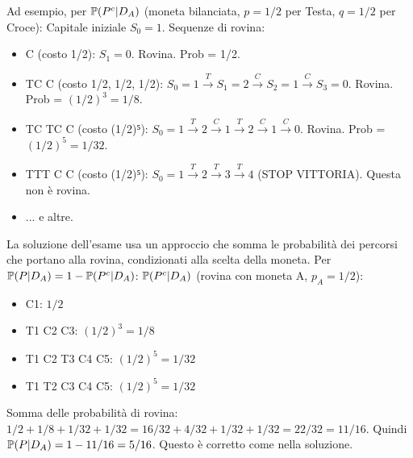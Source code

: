 \documentclass[12pt,a4paper]{article}
\begin{document}
\begin{example}
Ad esempio, per $\mathbb{P}(P^c|D_A)$ (moneta bilanciata, $p=1/2$ per Testa, $q=1/2$ per Croce):
Capitale iniziale $S_0=1$.
Sequenze di rovina:
\begin{itemize}
    \item C (costo 1/2): $S_1=0$. Rovina. Prob = 1/2.
    \item TC C (costo 1/2, 1/2, 1/2): $S_0=1 \xrightarrow{T} S_1=2 \xrightarrow{C} S_2=1 \xrightarrow{C} S_3=0$. Rovina. Prob = $(1/2)^3 = 1/8$.
    \item TC TC C (costo (1/2)⁵): $S_0=1 \xrightarrow{T} 2 \xrightarrow{C} 1 \xrightarrow{T} 2 \xrightarrow{C} 1 \xrightarrow{C} 0$. Rovina. Prob = $(1/2)^5 = 1/32$.
    \item TTT C C (costo (1/2)⁵): $S_0=1 \xrightarrow{T} 2 \xrightarrow{T} 3 \xrightarrow{T} 4$ (STOP VITTORIA). Questa non è rovina.
    \item ... e altre.
\end{itemize}
La soluzione dell'esame usa un approccio che somma le probabilità dei percorsi che portano alla rovina, condizionati alla scelta della moneta.
Per $\mathbb{P}(P|D_A) = 1 - \mathbb{P}(P^c|D_A)$:
$\mathbb{P}(P^c|D_A)$ (rovina con moneta A, $p_A=1/2$):
\begin{itemize}
    \item C1: $1/2$
    \item T1 C2 C3: $(1/2)^3 = 1/8$
    \item T1 C2 T3 C4 C5: $(1/2)^5 = 1/32$
    \item T1 T2 C3 C4 C5: $(1/2)^5 = 1/32$
\end{itemize}
Somma delle probabilità di rovina: $1/2 + 1/8 + 1/32 + 1/32 = 16/32 + 4/32 + 1/32 + 1/32 = 22/32 = 11/16$.
Quindi $\mathbb{P}(P|D_A) = 1 - 11/16 = 5/16$. Questo è corretto come nella soluzione.


\end{example}
\end{document}
